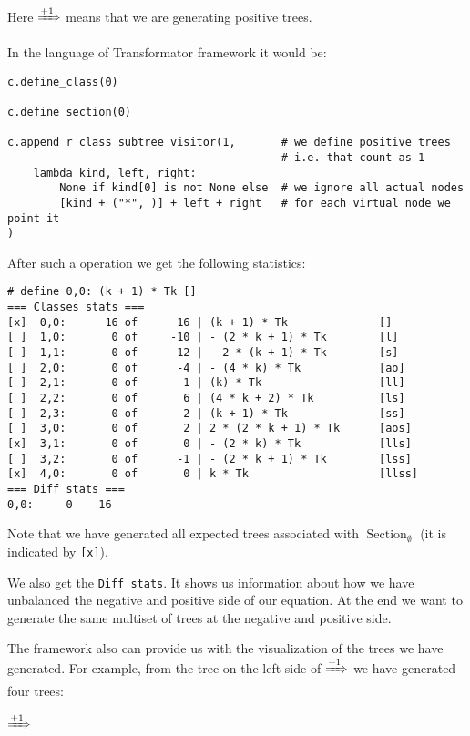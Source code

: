 \documentclass[final]{article}
\theoremstyle{definition}
\theoremstyle{definition}
\theoremstyle{remark}
\DeclareMathOperator{\tSection}{\text{Section}}
\newcommand{\includeinlinesvg}[2]{\begin{minipage}{#1\textwidth}\end{minipage}}
\begin{document}
Here \(\xRightarrow{+1}\) means that we are generating positive trees.

In the language of Transformator framework it would be:

\begin{lstlisting}
c.define_class(0)

c.define_section(0)

c.append_r_class_subtree_visitor(1,       # we define positive trees
                                          # i.e. that count as 1
    lambda kind, left, right:
        None if kind[0] is not None else  # we ignore all actual nodes
        [kind + ("*", )] + left + right   # for each virtual node we point it
)
\end{lstlisting}

After such a operation we get the following statistics:

\begin{lstlisting}
# define 0,0: (k + 1) * Tk []
=== Classes stats ===
[x]  0,0:      16 of      16 | (k + 1) * Tk              []
[ ]  1,0:       0 of     -10 | - (2 * k + 1) * Tk        [l]
[ ]  1,1:       0 of     -12 | - 2 * (k + 1) * Tk        [s]
[ ]  2,0:       0 of      -4 | - (4 * k) * Tk            [ao]
[ ]  2,1:       0 of       1 | (k) * Tk                  [ll]
[ ]  2,2:       0 of       6 | (4 * k + 2) * Tk          [ls]
[ ]  2,3:       0 of       2 | (k + 1) * Tk              [ss]
[ ]  3,0:       0 of       2 | 2 * (2 * k + 1) * Tk      [aos]
[x]  3,1:       0 of       0 | - (2 * k) * Tk            [lls]
[ ]  3,2:       0 of      -1 | - (2 * k + 1) * Tk        [lss]
[x]  4,0:       0 of       0 | k * Tk                    [llss]
=== Diff stats ===
0,0:     0    16
\end{lstlisting}

Note that we have generated all expected trees associated with \(\tSection_\emptyset\) (it is indicated by \verb|[x]|).

We also get the \verb|Diff stats|. It shows us information about how we have unbalanced the negative and positive side of our equation. At the end we want to generate the same multiset of trees at the negative and positive side.

The framework also can provide us with the visualization of the trees we have generated. For example, from the tree on the left side of \(\xRightarrow{+1}\) we have generated four trees:

\includeinlinesvg{.19}{lambda__trees_00__4_base}%
\(\xRightarrow{+1}\)%
\includeinlinesvg{.19}{lambda__trees_00__4}%
\includeinlinesvg{.19}{lambda__trees_00__5}%
\includeinlinesvg{.19}{lambda__trees_00__6}%
\includeinlinesvg{.19}{lambda__trees_00__7}%
\end{document}
